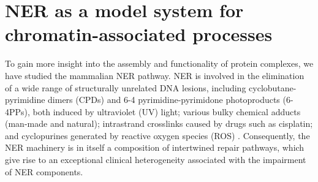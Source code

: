 \section{NER as a model system for chromatin-associated processes}
\label{sec:NERexperiments}
To gain more insight into the assembly and functionality of protein complexes, we have studied the mammalian NER pathway. NER is involved in the elimination of a wide range of structurally unrelated DNA lesions, including cyclobutane-pyrimidine dimers (CPDs) and 6-4 pyrimidine-pyrimidone photoproducts (6-4PPs), both induced by ultraviolet (UV) light; various bulky chemical adducts (man-made and natural); intrastrand crosslinks caused by drugs such as cisplatin; and cyclopurines generated by reactive oxygen species (ROS) \cite{Marteijn2014}. Consequently, the NER machinery is in itself a composition of intertwined repair pathways, which give rise to an exceptional clinical heterogeneity associated with the impairment of NER components. 


